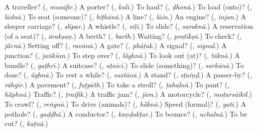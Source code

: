 \begin{tcolorbox}[breakable,colback=teal!4,colframe=teal!35!black,title={Before you move on}]
A traveller? (\textbf{}, \emph{musāfir}.) A porter? (\textbf{}, \emph{kulī}.) To haul? (\textbf{}, \emph{ḍhonā}.) To load (onto)? (\textbf{}, \emph{lādnā}.) To seat (someone)? (\textbf{}, \emph{biṭhānā}.) A line? (\textbf{}, \emph{lāin}.) An engine? (\textbf{}, \emph{injan}.) A sleeper carriage? (\textbf{}, \emph{slīpar}.) A whistle? (\textbf{}, \emph{sīṭī}.) To slide? (\textbf{}, \emph{saraknā}.) A reservation (of a seat)? (\textbf{}, \emph{ārakṣaṇ}.) A berth? (\textbf{}, \emph{barth}.) Waiting? (\textbf{}, \emph{pratīkṣā}.) To check? (\textbf{}, \emph{jā̃cnā}.) Setting off? (\textbf{}, \emph{ravānā}.) A gate? (\textbf{}, \emph{phāṭak}.) A signal? (\textbf{}, \emph{signal}.) A junction? (\textbf{}, \emph{jaṅkśan}.) To step over? (\textbf{}, \emph{lā̃ghnā}.) To look out (at)? (\textbf{}, \emph{tāknā}.) A bundle? (\textbf{}, \emph{gaṭhrī}.) A suitcase? (\textbf{}, \emph{aṭaicī}.) To slide (something)? (\textbf{}, \emph{sarkānā}.) To doze? (\textbf{}, \emph{ū̃ghnā}.) To rest a while? (\textbf{}, \emph{sustānā}.) A stand? (\textbf{}, \emph{sṭaiṇḍ}.) A passer-by? (\textbf{}, \emph{rāhgīr}.) A pavement? (\textbf{}, \emph{fuṭpāth}.) To take a stroll? (\textbf{}, \emph{ṭahalnā}.) To pant? (\textbf{}, \emph{hā̃phnā}.) Traffic? (\textbf{}, \emph{ṭraifik}.) A traffic jam? (\textbf{}, \emph{jām}.) A motorcycle? (\textbf{}, \emph{moṭarsāikil}.) To crawl? (\textbf{}, \emph{reṅgnā}.) To drive (animals)? (\textbf{}, \emph{hā̃knā}.) Speed (formal)? (\textbf{}, \emph{gati}.) A pothole? (\textbf{}, \emph{gaḍḍhā}.) A conductor? (\textbf{}, \emph{kaṇḍakṭar}.) To bounce? (\textbf{}, \emph{uchalnā}.) To be cut? (\textbf{}, \emph{kaṭnā}.)
\end{tcolorbox}
